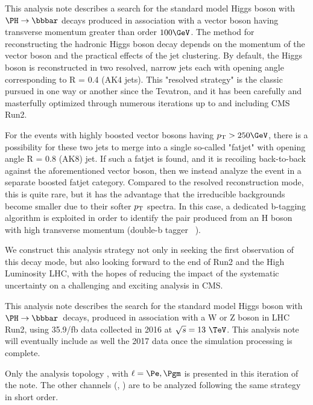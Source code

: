 This analysis note describes a search for the standard model Higgs boson with $\PH\to\bbbar$ decays produced in association with a vector boson having transverse momentum greater than order $100\GeV$.
The method for reconstructing the hadronic Higgs boson decay depends on the momentum of the vector boson and the practical effects of the jet clustering.
By default, the Higgs boson is reconstructed in two resolved, narrow jets each with opening angle corresponding to R = 0.4 (AK4 jets).
This "resolved strategy" is the classic pursued in one way or another since the Tevatron, and it has been carefully and masterfully optimized through numerous iterations up to and including CMS Run2.

For the events with highly boosted vector bosons having $\pt > 250\GeV$, there is a possibility for these two jets to merge into a single so-called "fatjet" with opening angle R = 0.8 (AK8) jet. If such a fatjet is found, and it is recoiling back-to-back against the aforementioned vector boson, then we instead analyze the event in a separate boosted fatjet category.
Compared to the resolved reconstruction mode, this is quite rare, but it has the advantage that the irreducible backgrounds become smaller due to their softer $p_{\mathrm{T}}$ spectra. In this case, a dedicated b-tagging algorithm is exploited in order to identify the \bbbar pair produced from an H boson with high transverse momentum (double-b tagger ~\cite{CMS-PAS-BTV-15-002}).

We construct this analysis strategy not only in seeking the first observation of this decay mode, but also
looking forward to the end of Run2 and the High Luminosity LHC, with the hopes of reducing the impact of the systematic uncertainty
on a challenging and exciting analysis in CMS.


This analysis note describes the search for the standard model Higgs boson 
with $\PH\to\bbbar$\ decays, produced in association with a W or Z boson in LHC Run2, 
using 35.9/fb
data collected in 2016 at $\sqrt{s}=13~\TeV$. This analysis note will eventually include as well the 2017 data once the simulation processing is complete.

Only the analysis topology \WlnH, with $\ell=\Pe, \Pgm$ is presented in this iteration of the note.
The other channels (\ZllH, \ZnnH) are to be analyzed following the same strategy in short order. 

